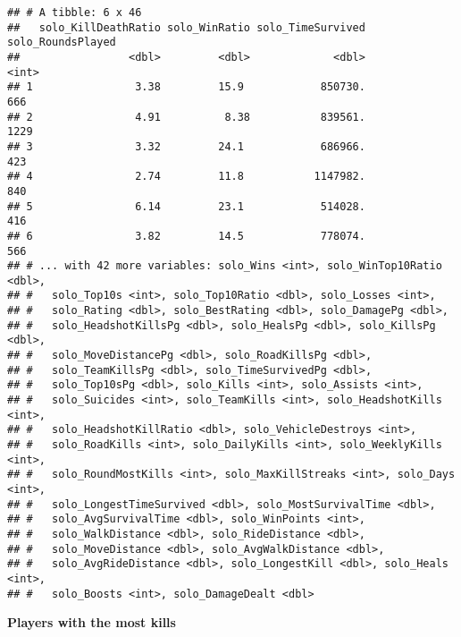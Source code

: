 \documentclass[]{article}
\begin{document}
\begin{verbatim}
## # A tibble: 6 x 46
##   solo_KillDeathRatio solo_WinRatio solo_TimeSurvived solo_RoundsPlayed
##                 <dbl>         <dbl>             <dbl>             <int>
## 1                3.38         15.9            850730.               666
## 2                4.91          8.38           839561.              1229
## 3                3.32         24.1            686966.               423
## 4                2.74         11.8           1147982.               840
## 5                6.14         23.1            514028.               416
## 6                3.82         14.5            778074.               566
## # ... with 42 more variables: solo_Wins <int>, solo_WinTop10Ratio <dbl>,
## #   solo_Top10s <int>, solo_Top10Ratio <dbl>, solo_Losses <int>,
## #   solo_Rating <dbl>, solo_BestRating <dbl>, solo_DamagePg <dbl>,
## #   solo_HeadshotKillsPg <dbl>, solo_HealsPg <dbl>, solo_KillsPg <dbl>,
## #   solo_MoveDistancePg <dbl>, solo_RoadKillsPg <dbl>,
## #   solo_TeamKillsPg <dbl>, solo_TimeSurvivedPg <dbl>,
## #   solo_Top10sPg <dbl>, solo_Kills <int>, solo_Assists <int>,
## #   solo_Suicides <int>, solo_TeamKills <int>, solo_HeadshotKills <int>,
## #   solo_HeadshotKillRatio <dbl>, solo_VehicleDestroys <int>,
## #   solo_RoadKills <int>, solo_DailyKills <int>, solo_WeeklyKills <int>,
## #   solo_RoundMostKills <int>, solo_MaxKillStreaks <int>, solo_Days <int>,
## #   solo_LongestTimeSurvived <dbl>, solo_MostSurvivalTime <dbl>,
## #   solo_AvgSurvivalTime <dbl>, solo_WinPoints <int>,
## #   solo_WalkDistance <dbl>, solo_RideDistance <dbl>,
## #   solo_MoveDistance <dbl>, solo_AvgWalkDistance <dbl>,
## #   solo_AvgRideDistance <dbl>, solo_LongestKill <dbl>, solo_Heals <int>,
## #   solo_Boosts <int>, solo_DamageDealt <dbl>
\end{verbatim}

\textbf{Players with the most kills}
\end{document}
